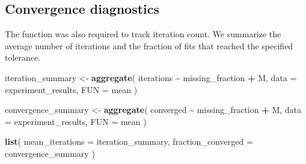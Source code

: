 \documentclass[
  11pt,
]{article}
\newenvironment{Shaded}{\begin{snugshade}}{\end{snugshade}}
\newcommand{\AttributeTok}[1]{\textcolor[rgb]{0.13,0.29,0.53}{#1}}
\newcommand{\FunctionTok}[1]{\textcolor[rgb]{0.13,0.29,0.53}{\textbf{#1}}}
\newcommand{\NormalTok}[1]{#1}
\newcommand{\OtherTok}[1]{\textcolor[rgb]{0.56,0.35,0.01}{#1}}
\newcommand{\SpecialCharTok}[1]{\textcolor[rgb]{0.81,0.36,0.00}{\textbf{#1}}}
\begin{document}
\subsection{Convergence diagnostics}\label{convergence-diagnostics}

The function was also required to track iteration count. We summarize
the average number of iterations and the fraction of fits that reached
the specified tolerance.

\begin{Shaded}
\begin{Highlighting}[]
\NormalTok{iteration\_summary }\OtherTok{\textless{}{-}} \FunctionTok{aggregate}\NormalTok{(}
\NormalTok{  iterations }\SpecialCharTok{\textasciitilde{}}\NormalTok{ missing\_fraction }\SpecialCharTok{+}\NormalTok{ M,}
  \AttributeTok{data =}\NormalTok{ experiment\_results,}
  \AttributeTok{FUN =}\NormalTok{ mean}
\NormalTok{)}

\NormalTok{convergence\_summary }\OtherTok{\textless{}{-}} \FunctionTok{aggregate}\NormalTok{(}
\NormalTok{  converged }\SpecialCharTok{\textasciitilde{}}\NormalTok{ missing\_fraction }\SpecialCharTok{+}\NormalTok{ M,}
  \AttributeTok{data =}\NormalTok{ experiment\_results,}
  \AttributeTok{FUN =}\NormalTok{ mean}
\NormalTok{)}

\FunctionTok{list}\NormalTok{(}
  \AttributeTok{mean\_iterations =}\NormalTok{ iteration\_summary,}
  \AttributeTok{fraction\_converged =}\NormalTok{ convergence\_summary}
\NormalTok{)}
\end{Highlighting}
\end{Shaded}
\end{document}
